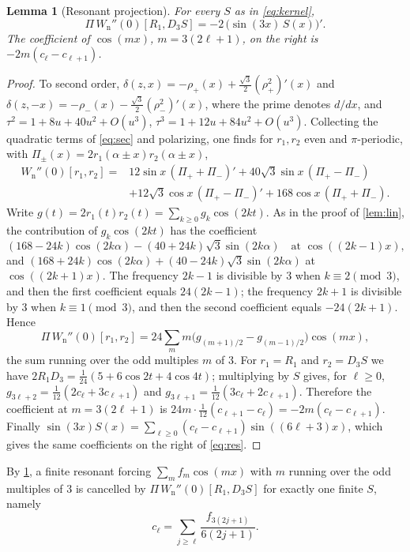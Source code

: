 \documentclass[11pt]{amsart}
\numberwithin{equation}{section}
\newtheorem{lemma}[theorem]{Lemma}
\theoremstyle{definition}
\theoremstyle{remark}
\newcommand{\Wn}{W_{\mathrm n}}
\begin{document}
\begin{lemma}[Resonant projection]\label{lem:res}
For every $S$ as in \eqref{eq:kernel},
\begin{equation}\label{eq:res}
\Pi\,\Wn''(0)[R_1,D_3S]=-2\,\bigl(\sin(3x)\,S(x)\bigr)'.
\end{equation}
The coefficient of $\cos(mx)$, $m=3(2\ell+1)$, on the right is $-2m(c_\ell-c_{\ell+1})$.
\end{lemma}

\begin{proof}
To second order, $\delta(z,x)=-\rho_+(x)+\frac{\sqrt3}2(\rho_+^2)'(x)$ and $\delta(z,-x)=-\rho_-(x)-\frac{\sqrt3}2(\rho_-^2)'(x)$, where the prime denotes $d/dx$, and $\tau^2=1+8u+40u^2+O(u^3)$, $\tau^3=1+12u+84u^2+O(u^3)$. Collecting the quadratic terms of \eqref{eq:sec} and polarizing, one finds for $r_1,r_2$ even and $\pi$-periodic, with $\Pi_\pm(x)=2r_1(\alpha\pm x)r_2(\alpha\pm x)$,
\begin{align*}
\Wn''(0)[r_1,r_2]={}&12\sin x\,(\Pi_++\Pi_-)'+40\sqrt3\sin x\,(\Pi_+-\Pi_-)\\
&+12\sqrt3\cos x\,(\Pi_+-\Pi_-)'+168\cos x\,(\Pi_++\Pi_-).
\end{align*}
Write $g(t)=2r_1(t)r_2(t)=\sum_{k\ge0}g_k\cos(2kt)$. As in the proof of \cref{lem:lin}, the contribution of $g_k\cos(2kt)$ has the coefficient
\[
(168-24k)\cos(2k\alpha)-(40+24k)\sqrt3\sin(2k\alpha)\quad\text{at }\cos((2k-1)x),
\]
and $(168+24k)\cos(2k\alpha)+(40-24k)\sqrt3\sin(2k\alpha)$ at $\cos((2k+1)x)$. The frequency $2k-1$ is divisible by $3$ when $k\equiv2\pmod3$, and then the first coefficient equals $24(2k-1)$; the frequency $2k+1$ is divisible by $3$ when $k\equiv1\pmod3$, and then the second coefficient equals $-24(2k+1)$. Hence
\[
\Pi\,\Wn''(0)[r_1,r_2]=24\sum_{m}m\bigl(g_{(m+1)/2}-g_{(m-1)/2}\bigr)\cos(mx),
\]
the sum running over the odd multiples $m$ of $3$. For $r_1=R_1$ and $r_2=D_3S$ we have $2R_1D_3=\frac1{24}(5+6\cos2t+4\cos4t)$; multiplying by $S$ gives, for $\ell\ge0$, $g_{3\ell+2}=\frac1{12}(2c_\ell+3c_{\ell+1})$ and $g_{3\ell+1}=\frac1{12}(3c_\ell+2c_{\ell+1})$. Therefore the coefficient at $m=3(2\ell+1)$ is $24m\cdot\frac1{12}(c_{\ell+1}-c_\ell)=-2m(c_\ell-c_{\ell+1})$. Finally $\sin(3x)S(x)=\sum_{\ell\ge0}(c_\ell-c_{\ell+1})\sin((6\ell+3)x)$, which gives the same coefficients on the right of \eqref{eq:res}.
\end{proof}

By \cref{lem:res}, a finite resonant forcing $\sum_mf_m\cos(mx)$ with $m$ running over the odd multiples of $3$ is cancelled by $\Pi\,\Wn''(0)[R_1,D_3S]$ for exactly one finite $S$, namely
\begin{equation}\label{eq:cell}
c_\ell=\sum_{j\ge\ell}\frac{f_{3(2j+1)}}{6(2j+1)} .
\end{equation}
\end{document}
